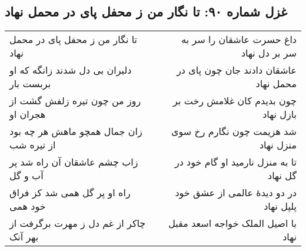 \begin{center}
\section*{غزل شماره ۹۰: تا نگار من ز محفل پای در محمل نهاد}
\label{sec:090}
\begin{longtable}{l p{0.5cm} r}
تا نگار من ز محفل پای در محمل نهاد
&&
داغ حسرت عاشقان را سر به سر بر دل نهاد
\\
دلبران بی دل شدند زانگه که او بربست بار
&&
عاشقان دادند جان چون پای در محمل نهاد
\\
روز من چون تیره زلفش گشت از هجران او
&&
چون بدیدم کان غلامش رخت بر بازل نهاد
\\
زان جمال همچو ماهش هر چه بود از تیره شب
&&
شد هزیمت چون نگارم رخ سوی منزل نهاد
\\
زاب چشم عاشقان آن راه شد پر آب و گل
&&
تا به منزل نارمید او گام خود در گل نهاد
\\
راه او پر گل همی شد کز فراق خود همی
&&
در دو دیدهٔ عالمی از عشق خود پلپل نهاد
\\
چاکر از غم دل ز مهرت برگرفت از بهر آنک
&&
با اصیل الملک خواجه اسعد مقبل نهاد
\\
\end{longtable}
\end{center}
